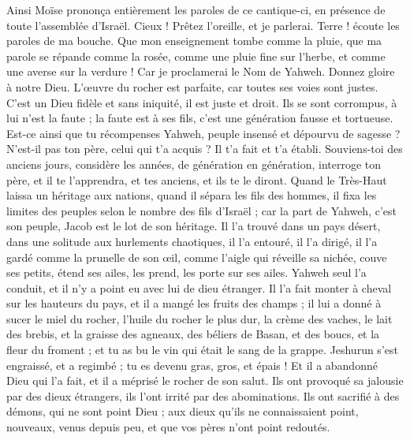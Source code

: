 \begin{multicols}{2}
Ainsi Moïse prononça entièrement les paroles de ce cantique-ci, en présence de toute l'assemblée d'Israël.
\VerseOne{}Cieux ! Prêtez l'oreille, et je parlerai. Terre ! écoute les paroles de ma bouche.
Que mon enseignement tombe comme la pluie, que ma parole se répande comme la rosée, comme une pluie fine sur l'herbe, et comme une averse sur la verdure !
Car je proclamerai le Nom de Yahweh. Donnez gloire à notre Dieu.
L'œuvre du rocher est parfaite, car toutes ses voies sont justes. C’est un Dieu fidèle et sans iniquité, il est juste et droit.
Ils se sont corrompus, à lui n’est la faute ; la faute est à ses fils, c’est une génération fausse et tortueuse.
Est-ce ainsi que tu récompenses Yahweh, peuple insensé et dépourvu de sagesse ? N'est-il pas ton père, celui qui t'a acquis ? Il t'a fait et t'a établi.
Souviens-toi des anciens jours, considère les années, de génération en génération, interroge ton père, et il te l'apprendra, et tes anciens, et ils te le diront.
Quand le Très-Haut laissa un héritage aux nations, quand il sépara les fils des hommes, il fixa les limites des peuples selon le nombre des fils d'Israël ;
car la part de Yahweh, c'est son peuple, Jacob est le lot de son héritage.
Il l'a trouvé dans un pays désert, dans une solitude aux hurlements chaotiques, il l'a entouré, il l'a dirigé, il l'a gardé comme la prunelle de son œil,
comme l'aigle qui réveille sa nichée, couve ses petits, étend ses ailes, les prend, les porte sur ses ailes.
Yahweh seul l'a conduit, et il n'y a point eu avec lui de dieu étranger.
Il l'a fait monter à cheval sur les hauteurs du pays, et il a mangé les fruits des champs ; il lui a donné à sucer le miel du rocher, l'huile du rocher le plus dur,
la crème des vaches, le lait des brebis, et la graisse des agneaux, des béliers de Basan, et des boucs, et la fleur du froment ; et tu as bu le vin qui était le sang de la grappe.
Jeshurun s'est engraissé, et a regimbé ; tu es devenu gras, gros, et épais ! Et il a abandonné Dieu qui l'a fait, et il a méprisé le rocher de son salut.
Ils ont provoqué sa jalousie par des dieux étrangers, ils l'ont irrité par des abominations.
Ils ont sacrifié à des démons, qui ne sont point Dieu ; aux dieux qu'ils ne connaissaient point, nouveaux, venus depuis peu, et que vos pères n'ont point redoutés.

\end{multicols}
